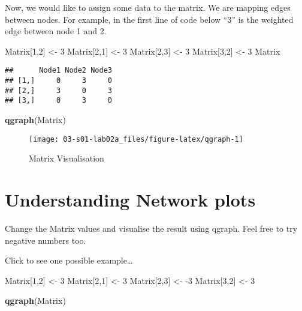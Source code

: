 \documentclass[]{book}
\newenvironment{Shaded}{\begin{snugshade}}{\end{snugshade}}
\newcommand{\DecValTok}[1]{\textcolor[rgb]{0.00,0.00,0.81}{#1}}
\newcommand{\KeywordTok}[1]{\textcolor[rgb]{0.13,0.29,0.53}{\textbf{#1}}}
\newcommand{\NormalTok}[1]{#1}
\newcommand{\StringTok}[1]{\textcolor[rgb]{0.31,0.60,0.02}{#1}}
\begin{document}
Now, we would like to assign some data to the matrix. We are mapping edges between nodes. For example, in the first line of code below ``3'' is the weighted edge between node 1 and 2.

\begin{Shaded}
\begin{Highlighting}[]
\NormalTok{Matrix[}\DecValTok{1}\NormalTok{,}\DecValTok{2}\NormalTok{] <-}\StringTok{ }\DecValTok{3}
\NormalTok{Matrix[}\DecValTok{2}\NormalTok{,}\DecValTok{1}\NormalTok{] <-}\StringTok{ }\DecValTok{3}
\NormalTok{Matrix[}\DecValTok{2}\NormalTok{,}\DecValTok{3}\NormalTok{] <-}\StringTok{ }\DecValTok{3}
\NormalTok{Matrix[}\DecValTok{3}\NormalTok{,}\DecValTok{2}\NormalTok{] <-}\StringTok{ }\DecValTok{3}
\NormalTok{Matrix}
\end{Highlighting}
\end{Shaded}

\begin{verbatim}
##      Node1 Node2 Node3
## [1,]     0     3     0
## [2,]     3     0     3
## [3,]     0     3     0
\end{verbatim}

\begin{Shaded}
\begin{Highlighting}[]
\KeywordTok{qgraph}\NormalTok{(Matrix)}
\end{Highlighting}
\end{Shaded}

\begin{figure}

{\centering \texttt{[image: 03-s01-lab02a\_files/figure-latex/qgraph-1]} 

}

\caption{Matrix Visualisation}\label{fig:qgraph}
\end{figure}

\hypertarget{understanding-network-plots}{%
\section{Understanding Network plots}\label{understanding-network-plots}}

Change the Matrix values and visualise the result using qgraph. Feel free to try negative numbers too.

Click to see one possible example\ldots{}

\begin{Shaded}
\begin{Highlighting}[]
\NormalTok{Matrix[}\DecValTok{1}\NormalTok{,}\DecValTok{2}\NormalTok{] <-}\StringTok{ }\DecValTok{3}
\NormalTok{Matrix[}\DecValTok{2}\NormalTok{,}\DecValTok{1}\NormalTok{] <-}\StringTok{ }\DecValTok{3}
\NormalTok{Matrix[}\DecValTok{2}\NormalTok{,}\DecValTok{3}\NormalTok{] <-}\StringTok{ }\DecValTok{-3}
\NormalTok{Matrix[}\DecValTok{3}\NormalTok{,}\DecValTok{2}\NormalTok{] <-}\StringTok{ }\DecValTok{3}

\KeywordTok{qgraph}\NormalTok{(Matrix)}
\end{Highlighting}
\end{Shaded}
\end{document}
